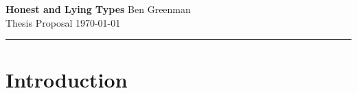 \documentclass[10pt]{article}
\renewcommand{\maketitle}{\noindent\textbf{Honest and Lying Types} \hfill Ben Greenman\\Thesis Proposal \hfill \today\\\hrule}
\begin{document}

\maketitle

\begin{abstract}

\end{abstract}


\newcommand{\mksec}[3]{\section{#3} \label{#1} }

\mksec{sec:introduction}{introduction}{Introduction}


\footnotesize


\end{document}
